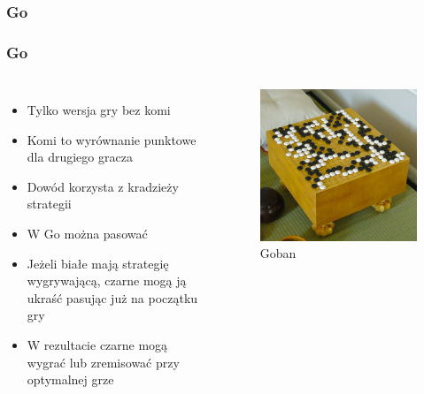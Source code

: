 \documentclass[polish,envcountsect,10pt]{beamer}
\begin{document}
            \subsubsection{Go}
                \begin{frame}
                    \frametitle{Go}
                    \begin{columns}
                            \begin{itemize}
                                \item<1-> Tylko wersja gry bez komi
                                \item<2-> Komi to wyrównanie punktowe dla drugiego gracza
                                \item<3-> Dowód korzysta z kradzieży strategii
                                \item<4-> W Go można pasować
                                \item<5-> Jeżeli białe mają strategię wygrywającą, czarne mogą ją ukraść pasując już na początku gry
                                \item<6-> W rezultacie czarne mogą wygrać lub zremisować przy optymalnej grze
                            \end{itemize}
                            \begin{figure}[H]
                                \centering
                                \includegraphics[width=\textwidth]{images/496px-FloorGoban.jpg}
                                \caption{Goban}
                            \end{figure} 
                    \end{columns}                    
                \end{frame}
            
\end{document}
